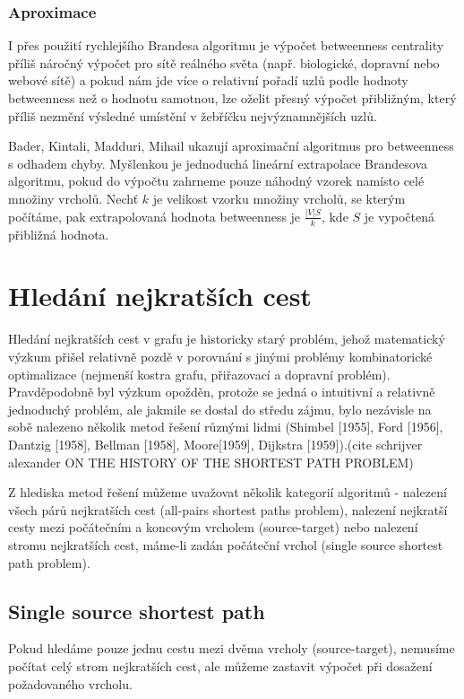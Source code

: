 \documentclass[12pt,titlepage]{report}
\begin{document}
\subsubsection{Aproximace}
I přes použití rychlejšího Brandesa algoritmu je výpočet betweenness centrality
příliš náročný výpočet pro sítě reálného světa (např. biologické, dopravní nebo
webové sítě) a pokud nám jde více o relativní pořadí uzlů podle hodnoty
betweenness než o hodnotu samotnou, lze oželit přesný výpočet přibližným, který
příliš nezmění výsledné umístění v žebříčku nejvýznamnějších uzlů.

Bader, Kintali, Madduri, Mihail ukazují aproximační algoritmus pro betweenness
s odhadem chyby.  Myšlenkou je jednoduchá lineární extrapolace Brandesova
algoritmu, pokud do výpočtu zahrneme pouze náhodný vzorek namísto celé množiny
vrcholů. Nechť $k$ je velikost vzorku množiny vrcholů, se kterým počítáme, pak
extrapolovaná hodnota betweenness je $\frac{|V| S}{k}$, kde $S$ je vypočtená
přibližná hodnota.


\section{Hledání nejkratších cest}
Hledání nejkratších cest v grafu je historicky starý problém, jehož matematický
výzkum přišel relativně pozdě v porovnání s jinými problémy kombinatorické
optimalizace (nejmenší kostra grafu, přiřazovací a dopravní problém).
Pravděpodobně byl výzkum opožděn, protože se jedná o intuitivní a relativně
jednoduchý problém, ale jakmile se dostal do středu zájmu, bylo nezávisle na
sobě nalezeno několik metod řešení různými lidmi (Shimbel [1955], Ford
[1956], Dantzig [1958], Bellman [1958], Moore[1959], Dijkstra [1959]).(cite
schrijver alexander ON THE HISTORY OF THE SHORTEST PATH PROBLEM)

Z hlediska metod řešení můžeme uvažovat několik kategorií algoritmů - nalezení
všech párů nejkratších cest (all-pairs shortest paths problem), nalezení
nejkratší cesty mezi počátečním a koncovým vrcholem (source-target) nebo
nalezení stromu nejkratších cest, máme-li zadán počáteční vrchol (single source
shortest path problem).

\subsection{Single source shortest path}
Pokud hledáme pouze jednu cestu mezi dvěma vrcholy (source-target), nemusíme
počítat celý strom nejkratších cest, ale můžeme zastavit výpočet při dosažení
požadovaného vrcholu. 
\end{document}
